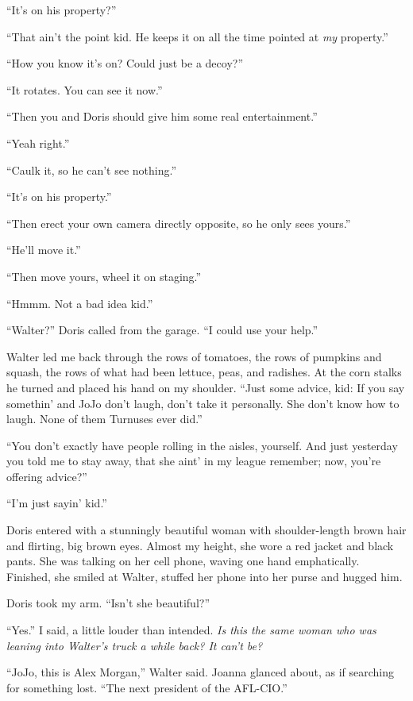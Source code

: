 ``It's on his property?''

``That ain't the point kid. He keeps it on all the time pointed at
\emph{my} property.''

``How you know it's on? Could just be a decoy?''

``It rotates. You can see it now.''

``Then you and Doris should give him some real entertainment.''

``Yeah right.''

``Caulk it, so he can't see nothing.''

``It's on his property.''

``Then erect your own camera directly opposite, so he only sees yours.''

``He'll move it.''

``Then move yours, wheel it on staging.''

``Hmmm. Not a bad idea kid.''

``Walter?'' Doris called from the garage. ``I could use your help.''

Walter led me back through the rows of tomatoes, the rows of pumpkins
and squash, the rows of what had been lettuce, peas, and radishes. At
the corn stalks he turned and placed his hand on my shoulder. ``Just
some advice, kid: If you say somethin' and JoJo don't laugh, don't take
it personally. She don't know how to laugh. None of them Turnuses ever
did.''

``You don't exactly have people rolling in the aisles, yourself. And
just yesterday you told me to stay away, that she aint' in my league
remember; now, you're offering advice?''

``I'm just sayin' kid.''

Doris entered with a stunningly beautiful woman with shoulder-length
brown hair and flirting, big brown eyes. Almost my height, she wore a
red jacket and black pants. She was talking on her cell phone, waving
one hand emphatically. Finished, she smiled at Walter, stuffed her phone
into her purse and hugged him.

Doris took my arm. ``Isn't she beautiful?''

``Yes.'' I said, a little louder than intended. \emph{Is this the same
woman who was leaning into Walter's truck a while back? It can't be?}

``JoJo, this is Alex Morgan,'' Walter said. Joanna glanced about, as if
searching for something lost. ``The next president of the AFL-CIO.''

